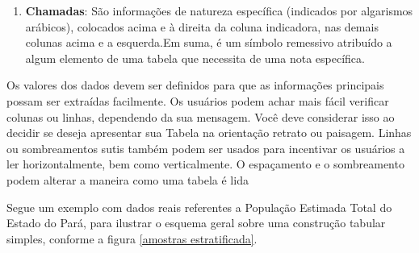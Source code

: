 \begin{enumerate}
\item \textbf{Chamadas}: São informações de natureza específica (indicados por algarismos arábicos), colocados acima e à direita da coluna indicadora, nas demais colunas acima e a esquerda.Em suma, é um símbolo remessivo atribuído a algum elemento de uma tabela que necessita de uma nota específica.
\end{enumerate}






Os valores dos dados devem ser definidos para que as informações principais possam ser extraídas facilmente. Os usuários podem achar mais fácil verificar colunas ou linhas, dependendo da sua mensagem. Você deve considerar isso ao decidir se deseja apresentar sua Tabela na orientação retrato ou paisagem. Linhas ou sombreamentos sutis também podem ser usados para incentivar os usuários a ler horizontalmente, bem como verticalmente. O espaçamento e o sombreamento podem alterar a maneira como uma tabela é lida \vskip0.3cm

Segue um exemplo com dados reais referentes a População Estimada Total do Estado do Pará, para ilustrar o esquema geral sobre uma construção tabular simples, conforme a figura \ref{amostras estratificada}.




